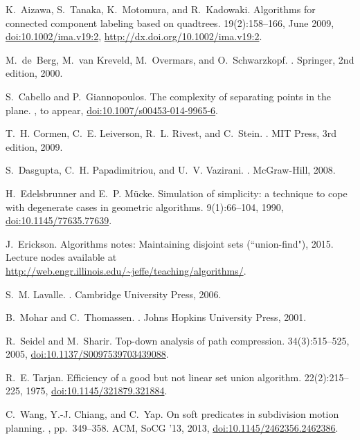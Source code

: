 \documentclass[a4paper,11pt]{article}
\begin{document}
\begin{thebibliography}{10}

K.~Aizawa, S.~Tanaka, K.~Motomura, and R.~Kadowaki.
\newblock Algorithms for connected component labeling based on quadtrees.
  19(2):158--166, June 2009, \href{http://dx.doi.org/10.1002/ima.v19:2}{doi:10.1002/ima.v19:2}, \url{http://dx.doi.org/10.1002/ima.v19:2}.

M.~de~Berg, M.~van Kreveld, M.~Overmars, and O.~Schwarzkopf.
.
\newblock Springer, 2nd edition, 2000.

S.~Cabello and P.~Giannopoulos.
\newblock The complexity of separating points in the plane.
, to appear,
  \href{http://dx.doi.org/10.1007/s00453-014-9965-6}{doi:10.1007/s00453-014-9965-6}.

T.~H. Cormen, C.~E. Leiverson, R.~L. Rivest, and C.~Stein.
.
\newblock MIT Press, 3rd edition, 2009.

S.~Dasgupta, C.~H. Papadimitriou, and U.~V. Vazirani.
.
\newblock McGraw-Hill, 2008.

H.~Edelsbrunner and E.~P. M{\"{u}}cke.
\newblock Simulation of simplicity: a technique to cope with degenerate cases
  in geometric algorithms.
 9(1):66--104, 1990,
  \href{http://dx.doi.org/10.1145/77635.77639}{doi:10.1145/77635.77639}.

J.~Erickson.
\newblock Algorithms notes: Maintaining disjoint sets (``union-find"), 2015.
\newblock Lecture nodes available at
  \url{http://web.engr.illinois.edu/~jeffe/teaching/algorithms/}.

S.~M. Lavalle.
.
\newblock Cambridge University Press, 2006.

B.~Mohar and C.~Thomassen.
.
\newblock Johns Hopkins University Press, 2001.

R.~Seidel and M.~Sharir.
\newblock Top-down analysis of path compression.
 34(3):515--525, 2005,
  \href{http://dx.doi.org/10.1137/S0097539703439088}{doi:10.1137/S0097539703439088}.

R.~E. Tarjan.
\newblock Efficiency of a good but not linear set union algorithm.
 22(2):215--225, 1975,
  \href{http://dx.doi.org/10.1145/321879.321884}{doi:10.1145/321879.321884}.

C.~Wang, Y.-J. Chiang, and C.~Yap.
\newblock On soft predicates in subdivision motion planning.
, pp.~349--358. ACM, SoCG '13, 2013,
  \href{http://dx.doi.org/10.1145/2462356.2462386}{doi:10.1145/2462356.2462386}.

\end{thebibliography}
\end{document}
